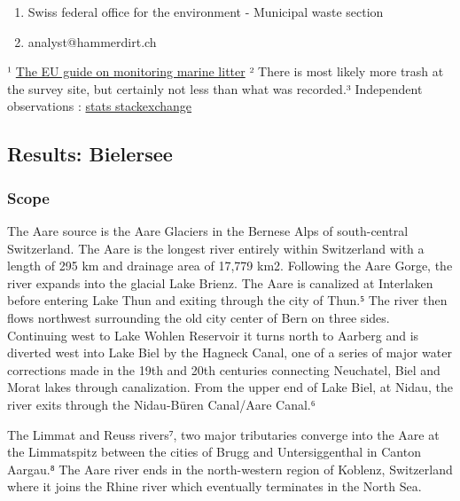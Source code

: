\documentclass[11pt]{article}
\providecommand{\tightlist}{%
      \setlength{\itemsep}{0pt}\setlength{\parskip}{0pt}}
\begin{document}
\begin{enumerate}
\def\labelenumi{\arabic{enumi}.}
\tightlist
\item
  Swiss federal office for the environment - Municipal waste section
\item
  analyst@hammerdirt.ch
\end{enumerate}

¹ \href{https://mcc.jrc.ec.europa.eu/documents/201702074014.pdf}{The EU
guide on monitoring marine litter} ² There is most likely more trash at
the survey site, but certainly not less than what was recorded.³
Independent observations :
\href{https://stats.stackexchange.com/questions/116355/what-does-independent-observations-mean}{stats
stackexchange}
 
            
    
    \hypertarget{results-bielersee}{%
\subsection{Results: Bielersee}\label{results-bielersee}}

    

    \hypertarget{scope}{%
\subsubsection{Scope}\label{scope}}

The Aare source is the Aare Glaciers in the Bernese Alps of
south-central Switzerland. The Aare is the longest river entirely within
Switzerland with a length of 295 km and drainage area of 17,779 km2.
Following the Aare Gorge, the river expands into the glacial Lake
Brienz. The Aare is canalized at Interlaken before entering Lake Thun
and exiting through the city of Thun.⁵ The river then flows northwest
surrounding the old city center of Bern on three sides. Continuing west
to Lake Wohlen Reservoir it turns north to Aarberg and is diverted west
into Lake Biel by the Hagneck Canal, one of a series of major water
corrections made in the 19th and 20th centuries connecting Neuchatel,
Biel and Morat lakes through canalization. From the upper end of Lake
Biel, at Nidau, the river exits through the Nidau-Büren Canal/Aare
Canal.⁶

The Limmat and Reuss rivers⁷, two major tributaries converge into the
Aare at the Limmatspitz between the cities of Brugg and Untersiggenthal
in Canton Aargau.⁸ The Aare river ends in the north-western region of
Koblenz, Switzerland where it joins the Rhine river which eventually
terminates in the North Sea.
\end{document}
